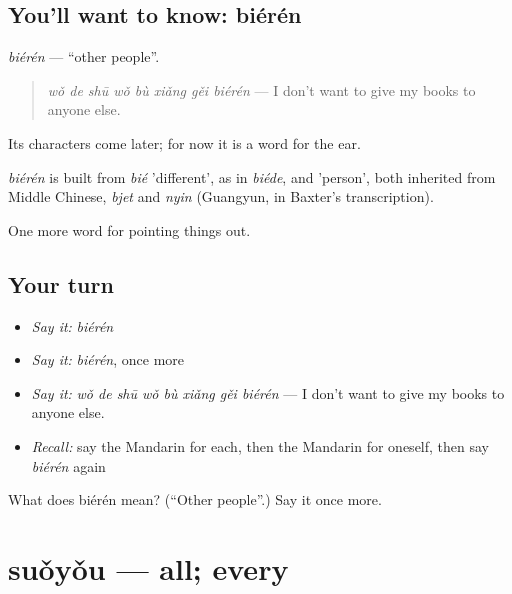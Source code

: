 \subsection*{You'll want to know: biérén}
\emph{biérén} — \textquotedblleft{}other people\textquotedblright{}.

\begin{quote}
\emph{wǒ de shū wǒ bù xiǎng gěi biérén} — I don't want to give my books to anyone else.
\end{quote}

Its characters come later; for now it is a word for the ear.

\begin{cousinweb}
\emph{biérén} is built from \emph{bié} 'different', as in \emph{biéde}, and  'person', both inherited from Middle Chinese, \emph{bjet} and \emph{nyin} (Guangyun, in Baxter's transcription).
\end{cousinweb}

\begin{grammarlens}[title={What you've built}]
One more word for pointing things out.
\end{grammarlens}

\subsection*{Your turn}
\begin{itemize}
\raggedright
  \item \emph{Say it:} \emph{biérén}
  \item \emph{Say it:} \emph{biérén}, once more
  \item \emph{Say it:} \emph{wǒ de shū wǒ bù xiǎng gěi biérén} — I don't want to give my books to anyone else.
  \item \emph{Recall:} say the Mandarin for each, then the Mandarin for oneself, then say \emph{biérén} again
\end{itemize}

\begin{tcolorbox}[breakable,colback=teal!4,colframe=teal!35!black,title={Before you move on}]
What does biérén mean? (\textquotedblleft{}Other people\textquotedblright{}.) Say it once more.
\end{tcolorbox}
\section[suǒyǒu]{suǒyǒu — all; every}

\label{lesson:ZH-C138-suoyou}



